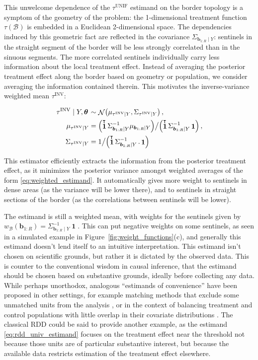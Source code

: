 \documentclass[letter]{article}
\let\originalleft\left
\let\originalright\right
\def\left#1{\mathopen{}\originalleft#1}
\def\right#1{\originalright#1\mathclose{}}
\DeclarePairedDelimiter{\parenthesis}{\lparen}{\rparen}
\newcommand{\del}[1]{\parenthesis*{#1}}
\DeclareMathOperator{\normal}{\mathcal{N}}
\DeclareMathOperator{\ones}{\mathbf{1}}
\newcommand*{\trans}{^{\mkern-1.5mu\intercal}}
\newcommand{\border}{\mathcal{B}}
\newcommand{\sentinel}{\bm{b}}
\newcommand{\numsent}{R}
\newcommand{\sentinels}{\sentinel_{1:\numsent}}
\newcommand{\unifavg}{\tau^{\mathrm{UNIF}}}
\newcommand{\invvar}{\tau^{\mathrm{INV}}}
\newcommand{\eqlabel}[1]{\label{#1}}
\newcommand{\hyperparam}{\bm{\theta}}
\newcommand{\weightb}{w_{\border}}
\begin{document}
This unwelcome dependence of the \(\unifavg\) estimand on the border topology is a symptom of the geometry of the problem: the 1-dimensional treatment function \(\tau(\border)\) is embedded in a Euclidean 2-dimensional space.
The dependencies induced by this geometric fact are reflected in the covariance \(\Sigma_{\sentinels \mid Y}\): sentinels in the straight segment of the border will be less strongly correlated than in the sinuous segments.
The more correlated sentinels individually carry less information about the local treatment effect.
Instead of averaging the posterior treatment effect along the border based on geometry or population, we consider averaging the information contained therein.
This motivates the inverse-variance weighted mean \(\invvar\):

\begin{equation}
\begin{split}
    \left. \invvar \mid Y, \hyperparam \right. &\sim \normal\del{\mu_{\invvar \mid Y}, \Sigma_{\invvar \mid Y}} \,, \\
    \mu_{\invvar \mid Y} &= \del{\ones\trans \Sigma_{\sentinels \mid Y}^{-1} \mu_{\sentinels \mid Y}} \big/ \del{\ones\trans \Sigma_{\sentinels \mid Y}^{-1} \ones} \,, \\
    \Sigma_{\invvar \mid Y} &= 1 \big/ \del{\ones\trans \Sigma_{\sentinels \mid Y}^{-1} \,. \ones}
\end{split}
\eqlabel{eq:invvar}
\end{equation}

This estimator efficiently extracts the information from the posterior treatment effect, as it minimizes the posterior variance amongst weighted averages of the form \eqref{eq:weighted_estimand}.
It automatically gives more weight to sentinels in dense areas (as the variance will be lower there), and to sentinels in straight sections of the border (as the correlations between sentinels will be lower).

The estimand is still a weighted mean, with weights for the sentinels given by \(\weightb(\sentinels) = \Sigma_{\sentinels \mid Y}^{-1} \ones\).
This can put negative weights on some sentinels, as seen in a simulated example in Figure~\ref{fig:weight_functions}(c), and generally this estimand doesn't lend itself to an intuitive interpretation.
This estimand isn't chosen on scientific grounds, but rather it is dictated by the observed data.
This is counter to the conventional wisdom in causal inference, that the estimand should be chosen based on substantive grounds, ideally before collecting any data.
While perhaps unorthodox, analogous ``estimands of convenience'' have been proposed in other settings, for example matching methods that exclude some unmatched units from the analysis \citep[discussed in][]{crump2009dealing}, or in the context of balancing treatment and control populations with little overlap in their covariate distributions \citep{li2016balancing}.
The classical RDD could be said to provide another example, as the estimand \eqref{eq:rdd_univ_estimand} focuses on the treatment effect near the threshold not because those units are of particular substantive interest, but because the available data restricts estimation of the treatment effect elsewhere.
    
\end{document}
